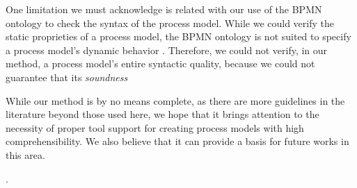 \documentclass[a4paper,twoside]{article}
\begin{document}
One limitation we must acknowledge is related with our use of the BPMN ontology to check the syntax of the process model. While we could verify the static proprieties of a process model, the BPMN ontology is not suited to specify  a process model's dynamic behavior \cite{Rospocher2014foisbpmn}. Therefore, we could not verify, in our method, a process model's entire syntactic quality, because we could not guarantee that its \textit{soundness}

While our method is by no means complete, as there are more guidelines in the literature beyond those used here, we hope that it brings attention to the necessity of proper tool support for creating process models with high comprehensibility. We also believe that it can provide a basis for future works in this area.

.

%


\end{document}
